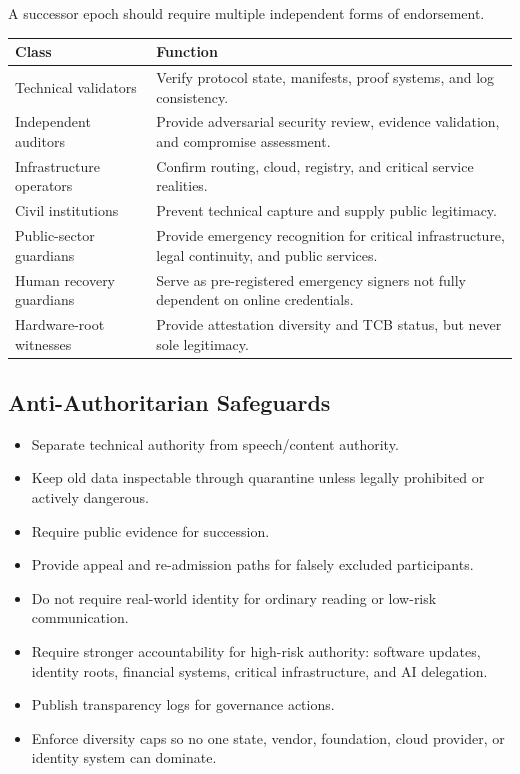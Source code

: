 \documentclass[11pt,letterpaper]{article}
\begin{document}
A successor epoch should require multiple independent forms of endorsement.

\begin{longtable}{p{}p{}}
\toprule
\textbf{Class} & \textbf{Function} \\
\midrule
Technical validators & Verify protocol state, manifests, proof systems, and log consistency. \\
Independent auditors & Provide adversarial security review, evidence validation, and compromise assessment. \\
Infrastructure operators & Confirm routing, cloud, registry, and critical service realities. \\
Civil institutions & Prevent technical capture and supply public legitimacy. \\
Public-sector guardians & Provide emergency recognition for critical infrastructure, legal continuity, and public services. \\
Human recovery guardians & Serve as pre-registered emergency signers not fully dependent on online credentials. \\
Hardware-root witnesses & Provide attestation diversity and TCB status, but never sole legitimacy. \\
\bottomrule
\end{longtable}

\subsection{Anti-Authoritarian Safeguards}

\begin{itemize}[leftmargin=1.4em]
\item Separate technical authority from speech/content authority.
\item Keep old data inspectable through quarantine unless legally prohibited or actively dangerous.
\item Require public evidence for succession.
\item Provide appeal and re-admission paths for falsely excluded participants.
\item Do not require real-world identity for ordinary reading or low-risk communication.
\item Require stronger accountability for high-risk authority: software updates, identity roots, financial systems, critical infrastructure, and AI delegation.
\item Publish transparency logs for governance actions.
\item Enforce diversity caps so no one state, vendor, foundation, cloud provider, or identity system can dominate.
\end{itemize}
\end{document}
